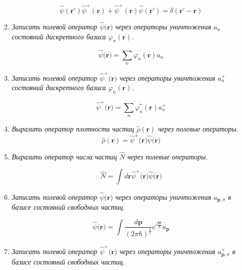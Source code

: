 \documentclass{article}
\begin{document}
\begin{enumerate}
	\begin{equation}
		\hat{\psi}(\textbf{r}')\hat{\psi}^+(\textbf{r}) + \hat{\psi}^+(\textbf{r})\hat{\psi}(\textbf{r}') = \delta(\textbf{r}' - \textbf{r})
	\end{equation}
	
	\item \textit{Записать полевой оператор $\hat{\psi}(\textbf{r)}$ через операторы уничтожения $a_n$ состояний дискретного базиса $\varphi_n(\textbf{r})$.}

	\begin{equation}
		\hat{\psi}(\textbf{r)} = \sum\limits_{n} \varphi_n(\textbf{r}) a_n
	\end{equation}		
	
	\item \textit{Записать полевой оператор $\hat{\psi}^+(\textbf{r)}$ через операторы уничтожения $a_n^+$ состояний дискретного базиса $\varphi_n(\textbf{r})$.}		
	
	\begin{equation}
		\hat{\psi}^+(\textbf{r)} = \sum\limits_{n} \varphi_n^*(\textbf{r}) a_n^+
	\end{equation}	
	
	\item \textit{Выразить оператор плотности частиц $\hat{\rho}(\textbf{r})$ через полевые операторы.}	
	\begin{equation}
		\hat{\rho}(\textbf{r}) = \hat{\psi}^+(\textbf{r)} \hat{\psi}(\textbf{r)}
	\end{equation}
	
	\item \textit{Выразить оператор числа частиц $\hat{N}$ через полевые операторы.}
	
	\begin{equation}
		\hat{N} = \int d\textbf{r}\hat{\psi}^+(\textbf{r)} \hat{\psi}(\textbf{r)}
	\end{equation}
	
	\item \textit{Записать полевой оператор $\hat{\psi}(\textbf{r)}$ через операторы уничтожения $a_{\textbf{p},\sigma}$ в базисе состояний свободных частиц.}
	
	\begin{equation}
		\hat{\psi}(\textbf{r)} = \int \frac{d\textbf{p}}{(2\pi\hbar)^\frac{3}{2}} e^{i\frac{\textbf{pr}}{\hbar}}a_\textbf{p}
	\end{equation}
	
	\item \textit{Записать полевой оператор $\hat{\psi}^+(\textbf{r)}$ через операторы уничтожения $a^+_{\textbf{p},\sigma}$ в базисе состояний свободных частиц.}
	

\end{enumerate}
\end{document}
